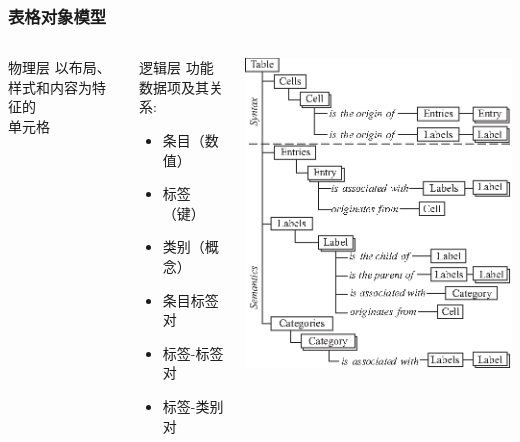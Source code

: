 \documentclass[10pt]{beamer}
\begin{document}
\begin{frame}
\frametitle{表格对象模型}
\begin{columns}[c] %
\begin{block}{\small 物理层}
\small 以布局、样式和内容为特征的\\单元格
\end{block}
\begin{block}{\small 逻辑层}
\small 功能数据项及其关系:
\begin{itemize}
	\item \small 条目（数值）
	\item \small 标签（键）
	\item \small 类别（概念）
	\item \small 条目标签对
	\item \small 标签-标签对
	\item \small 标签-类别对
\end{itemize}
\end{block}
\includegraphics[width=0.85\linewidth]{tom}
\end{columns}
\end{frame}
\end{document}

